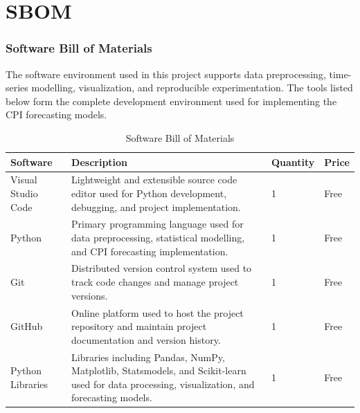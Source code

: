 %
%
%




\chapter{SBOM}




\subsection{Software Bill of Materials}

The software environment used in this project supports data preprocessing, time-series modelling, visualization, and reproducible experimentation. The tools listed below form the complete development environment used for implementing the CPI forecasting models.

\begin{table}[h]
	\centering
	\begin{tabular}{|p{3cm}|p{7cm}|p{2cm}|p{2cm}|}
		\hline
		\textbf{Software} & \textbf{Description} & \textbf{Quantity} & \textbf{Price} \\ \hline
		Visual Studio Code & Lightweight and extensible source code editor used for Python development, debugging, and project implementation. & 1 & Free \\ \hline
		Python & Primary programming language used for data preprocessing, statistical modelling, and CPI forecasting implementation. & 1 & Free \\ \hline
		Git & Distributed version control system used to track code changes and manage project versions. & 1 & Free \\ \hline
		GitHub & Online platform used to host the project repository and maintain project documentation and version history. & 1 & Free \\ \hline
		Python Libraries & Libraries including Pandas, NumPy, Matplotlib, Statsmodels, and Scikit-learn used for data processing, visualization, and forecasting models. & 1 & Free \\ \hline
	\end{tabular}
	\caption{Software Bill of Materials}
\end{table}

